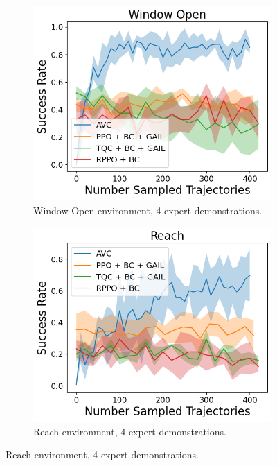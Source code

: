 \begin{figure}[htbp]
  \centering
  \begin{subfigure}[t]{0.45\textwidth}
    \includegraphics[width=\textwidth]{images/4_400/Window Open.png}
    \caption{Window Open environment, 4 expert demonstrations.}
  \end{subfigure}
  \begin{subfigure}[t]{0.45\textwidth}
    \includegraphics[width=\textwidth]{images/4_400/Reach.png}
    \caption{Reach environment, 4 expert demonstrations.}
  \end{subfigure}

\end{figure}
